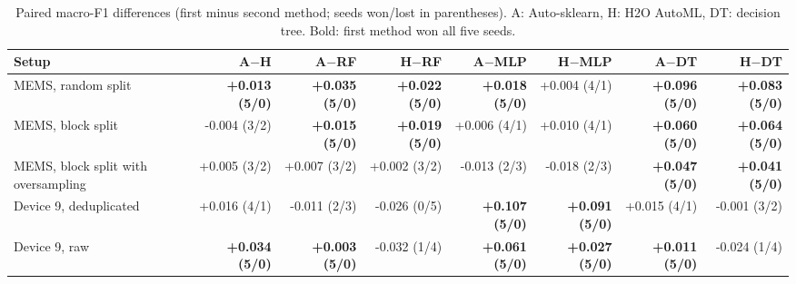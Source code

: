 \begin{table}[t]
\centering
\caption{Paired macro-F1 differences (first minus second method; seeds won/lost in parentheses). A: Auto-sklearn, H: H2O AutoML, DT: decision tree. Bold: first method won all five seeds.}
\label{tab:paired}
\scriptsize
\setlength{\tabcolsep}{3pt}
\begin{tabular}{@{}lrrrrrrr@{}}
\toprule
Setup & A$-$H & A$-$RF & H$-$RF & A$-$MLP & H$-$MLP & A$-$DT & H$-$DT \\
\midrule
MEMS, random split & \textbf{+0.013 (5/0)} & \textbf{+0.035 (5/0)} & \textbf{+0.022 (5/0)} & \textbf{+0.018 (5/0)} & +0.004 (4/1) & \textbf{+0.096 (5/0)} & \textbf{+0.083 (5/0)} \\
MEMS, block split & -0.004 (3/2) & \textbf{+0.015 (5/0)} & \textbf{+0.019 (5/0)} & +0.006 (4/1) & +0.010 (4/1) & \textbf{+0.060 (5/0)} & \textbf{+0.064 (5/0)} \\
MEMS, block split with oversampling & +0.005 (3/2) & +0.007 (3/2) & +0.002 (3/2) & -0.013 (2/3) & -0.018 (2/3) & \textbf{+0.047 (5/0)} & \textbf{+0.041 (5/0)} \\
Device 9, deduplicated & +0.016 (4/1) & -0.011 (2/3) & -0.026 (0/5) & \textbf{+0.107 (5/0)} & \textbf{+0.091 (5/0)} & +0.015 (4/1) & -0.001 (3/2) \\
Device 9, raw & \textbf{+0.034 (5/0)} & \textbf{+0.003 (5/0)} & -0.032 (1/4) & \textbf{+0.061 (5/0)} & \textbf{+0.027 (5/0)} & \textbf{+0.011 (5/0)} & -0.024 (1/4) \\
\bottomrule
\end{tabular}
\end{table}
